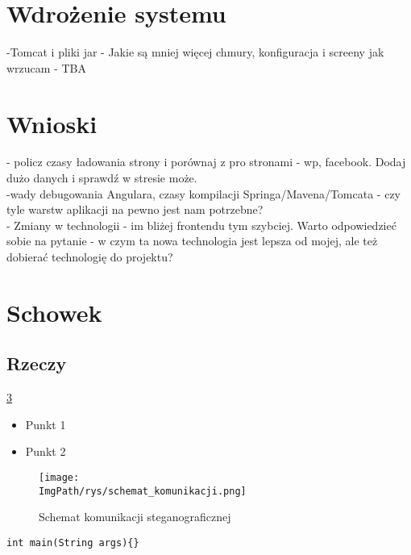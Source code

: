 \documentclass[a4paper,12pt,twoside,openany]{report}
\newcommand{\ImgPath}{.}
\begin{document}
\chapter{Wdrożenie systemu}
-Tomcat i pliki jar
- Jakie są mniej więcej chmury, konfiguracja i screeny jak wrzucam - TBA
\chapter{Wnioski}
- policz czasy ładowania strony i porównaj z pro stronami - wp, facebook. Dodaj dużo danych i sprawdź w stresie może.\\
-wady debugowania Angulara, czasy kompilacji Springa/Mavena/Tomcata - czy tyle warstw aplikacji na pewno jest nam potrzebne?\\
- Zmiany w technologii - im bliżej frontendu tym szybciej. Warto odpowiedzieć sobie na pytanie - w czym ta nowa technologia jest lepsza od mojej, ale też dobierać technologię do projektu?


\chapter{Schowek}
\label{Schowek}

\section{Rzeczy}
\ref{Schowek}
\cite{Stevens}
\begin{itemize}
	\item Punkt 1
	\item Punkt 2
\end{itemize}
\begin{figure}[!htbp]
	\begin{center}
		\centering
		\texttt{[image: \\ImgPath/rys/schemat\_komunikacji.png]}
	\end{center}
	\caption{Schemat komunikacji steganograficznej}
	\label{schematKomunikacji}
\end{figure}
\begin{lstlisting}
int main(String args){}
\end{lstlisting}


\begin{thebibliography}{99}


\end{thebibliography}

\zakonczenie  %
\end{document}
